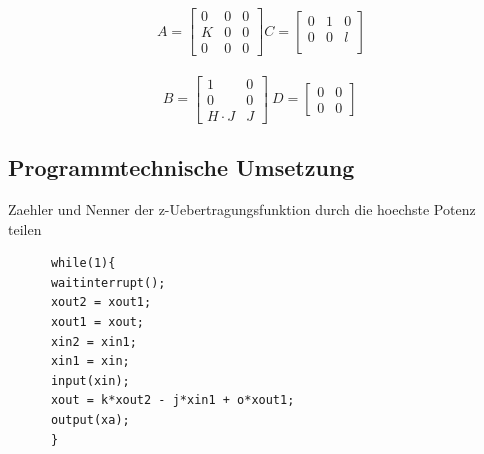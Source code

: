 \documentclass[10pt,a4paper]{article}
\begin{document}
  \begin{mdframed}[style=exercise]
   \[
        \ A = \begin{bmatrix}
            0&0&0\\
            K&0&0\\
            0&0&0
        \end{bmatrix}
        C = \begin{bmatrix}
            0&1&0\\
            0&0&l\\
        \end{bmatrix}\]\\
        \[B = \begin{bmatrix}
            1&0\\
            0&0\\
            H\cdot{}J&J
        \end{bmatrix} \
        D = \begin{bmatrix}
            0&0\\
            0&0
        \end{bmatrix}\]

  \end{mdframed}
  \subsection{Programmtechnische Umsetzung}
Zaehler und Nenner der z-Uebertragungsfunktion durch die hoechste Potenz teilen\\
  \begin{mdframed}[style=exercise]
    \begin{lstlisting}
      while(1){
      waitinterrupt();
      xout2 = xout1;
      xout1 = xout;
      xin2 = xin1;
      xin1 = xin;
      input(xin);
      xout = k*xout2 - j*xin1 + o*xout1;
      output(xa);
      }
    \end{lstlisting}
  \end{mdframed}
\end{document}
